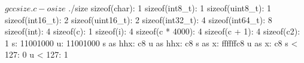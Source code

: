 \documentclass[12pt, oneside]{article}
\begin{document}

\begin{shell}[basicstyle=\ttfamily\scriptsize]
$ gcc size.c -o size
$ ./size 
sizeof(char): 1
sizeof(int8_t): 1
sizeof(uint8_t): 1
sizeof(int16_t): 2
sizeof(uint16_t): 2
sizeof(int32_t): 4
sizeof(int64_t): 8
sizeof(int): 4
sizeof(c): 1
sizeof(i): 4
sizeof(c * 4000): 4
sizeof(c + 1): 4
sizeof(c2): 1
s: 11001000             u: 11001000
s as hhx: c8            u as hhx: c8
s as x: ffffffc8        u as x: c8
s < 127: 0 u < 127: 1
\end{shell}

\newpage
\end{document}
